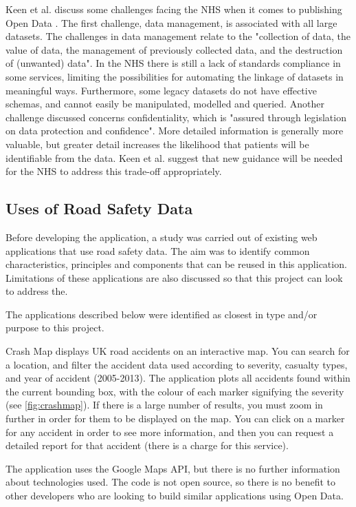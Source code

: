 \documentclass[authoryearcitations]{UoYCSproject}
\begin{document}
Keen et al. discuss some challenges facing the NHS when it comes to publishing Open Data \citep{Keen2013}. The first challenge, data management, is associated with all large datasets. The challenges in data management relate to the "collection of data, the value of data, the management of previously collected data, and the destruction of (unwanted) data". In the NHS there is still a lack of standards compliance in some services, limiting the possibilities for automating the linkage of datasets in meaningful ways. Furthermore, some legacy datasets do not have effective schemas, and cannot easily be manipulated, modelled and queried. Another challenge discussed concerns confidentiality, which is "assured through legislation on data protection and confidence".  More detailed information is generally more valuable, but greater detail increases the likelihood that patients will be identifiable from the data. Keen et al. suggest that new guidance will be needed for the NHS to address this trade-off appropriately.

\subsection{Uses of Road Safety Data}

Before developing the application, a study was carried out of existing web applications that use road safety data. The aim was to identify common characteristics, principles and components that can be reused in this application. Limitations of these applications are also discussed so that this project can look to address the.

The applications described below were identified as closest in type and/or purpose to this project.
 
Crash Map \citep{crashmap} displays UK road accidents on an interactive map. You can search for a location, and filter the accident data used according to severity, casualty types, and year of accident (2005-2013). The application plots all accidents found within the current bounding box, with the colour of each marker signifying the severity (see \autoref{fig:crashmap}). If there is a large number of results, you must zoom in further in order for them to be displayed on the map. You can click on a marker for any accident in order to see more information, and then you can request a detailed report for that accident (there is a charge for this service).

The application uses the Google Maps API, but there is no further information about technologies used. The code is not open source, so there is no benefit to other developers who are looking to build similar applications using Open Data. 
\end{document}

